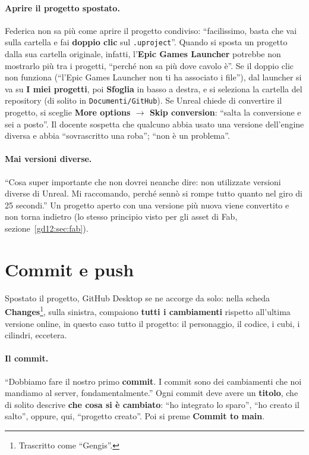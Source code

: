 \paragraph{Aprire il progetto spostato.} Federica non sa più come aprire il
progetto condiviso: ``facilissimo, basta che vai sulla cartella e fai
\textbf{doppio clic} sul \texttt{.uproject}''. Quando si sposta un progetto
dalla sua cartella originale, infatti, l'\textbf{Epic Games Launcher} potrebbe
non mostrarlo più tra i progetti, ``perché non sa più dove cavolo è''. Se il
doppio clic non funziona (``l'Epic Games Launcher non ti ha associato i file''),
dal launcher si va su \textbf{I miei progetti}, poi \textbf{Sfoglia} in basso a
destra, e si seleziona la cartella del repository (di solito in
\texttt{Documenti/GitHub}). Se Unreal chiede di convertire il progetto, si
sceglie \textbf{More options $\rightarrow$ Skip conversion}: ``salta la
conversione e sei a posto''. Il docente sospetta che qualcuno abbia usato una
versione dell'engine diversa e abbia ``sovrascritto una roba''; ``non è un
problema''.

\paragraph{Mai versioni diverse.} ``Cosa super importante che non dovrei neanche
dire: non utilizzate versioni diverse di Unreal. Mi raccomando, perché sennò si
rompe tutto quanto nel giro di 25 secondi.'' Un progetto aperto con una
versione più nuova viene convertito e non torna indietro (lo stesso principio
visto per gli asset di Fab, sezione~\ref{gd12:sec:fab}).

\section{Commit e push}
\label{gd13:sec:commit}

Spostato il progetto, GitHub Desktop se ne accorge da solo: nella scheda
\textbf{Changes}\footnote{Trascritto come ``Gengis''.}, sulla sinistra,
compaiono \textbf{tutti i cambiamenti} rispetto all'ultima versione online, in
questo caso tutto il progetto: il personaggio, il codice, i cubi, i cilindri,
eccetera.

\paragraph{Il commit.} ``Dobbiamo fare il nostro primo \textbf{commit}. I commit
sono dei cambiamenti che noi mandiamo al server, fondamentalmente.'' Ogni
commit deve avere un \textbf{titolo}, che di solito descrive \textbf{che cosa si
è cambiato}: ``ho integrato lo sparo'', ``ho creato il salto'', oppure, qui,
``progetto creato''. Poi si preme \textbf{Commit to main}.

